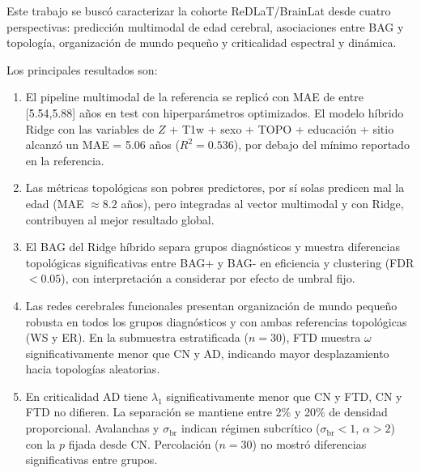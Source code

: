 \documentclass[12pt,a4paper]{article}
\begin{document}
Este trabajo se buscó caracterizar la cohorte ReDLaT/BrainLat\cite{prado2023brainlat} desde cuatro perspectivas: predicción
multimodal de edad cerebral, asociaciones entre BAG y topología, organización de mundo pequeño y criticalidad espectral y dinámica.

Los principales resultados son:

\begin{enumerate}

  \item El pipeline multimodal de la referencia\cite{bazan2026} se replicó con MAE
  de entre [5.54,5.88] años en test con hiperparámetros optimizados. El modelo híbrido Ridge con las variables de $Z$ + T1w + sexo + TOPO +  educación + sitio alcanzó un MAE = 5.06 años ($R^2 = 0.536$), por debajo del mínimo reportado en la referencia.

  \item Las métricas topológicas\cite{rubinov2010} son pobres predictores, por sí solas predicen mal la edad (MAE $\approx 8.2$ años), pero integradas al vector multimodal y con Ridge, contribuyen al mejor resultado global.

  \item El BAG del Ridge híbrido separa grupos diagnósticos y muestra diferencias topológicas
  significativas entre BAG+ y BAG- en eficiencia y clustering (FDR $< 0.05$), con interpretación
  a considerar por efecto de umbral fijo.

  \item Las redes cerebrales funcionales presentan organización de mundo pequeño robusta\cite{watts1998} en
  todos los grupos diagnósticos y con ambas referencias topológicas (WS y ER). En la submuestra
  estratificada ($n = 30$), FTD muestra $\omega$ significativamente menor que CN y AD, indicando
  mayor desplazamiento hacia topologías aleatorias.

  \item En criticalidad AD tiene $\lambda_1$\cite{larremore2011} significativamente menor que CN y FTD, CN y FTD no difieren. La separación se mantiene entre  2\% y 20\% de densidad proporcional. Avalanchas\cite{beggs2003} y $\sigma_{\text{br}}$ indican régimen subcrítico ($\sigma_{\text{br}} < 1$, $\alpha > 2$) con la $p$ fijada desde CN. Percolación ($n = 30$) no mostró diferencias significativas entre grupos.

\end{enumerate}

\end{document}
